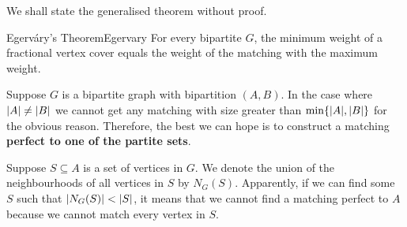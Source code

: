 \documentclass[math]{amznotes}
\theoremstyle{remark}
\newcommand{\0}{\mathbf{0}}
\newcommand{\1}{\mathbf{1}}
\begin{document}
We shall state the generalised theorem without proof.
\begin{thmbox}{Egerv\'{a}ry's Theorem}{Egervary}
    For every bipartite $G$, the minimum weight of a fractional vertex cover equals the weight of the matching with the maximum weight.
\end{thmbox}
Suppose $G$ is a bipartite graph with bipartition $(A, B)$. In the case where ${\left\lvert {A} \right\rvert} \neq {\left\lvert {B} \right\rvert}$ we cannot get any matching with size greater than $\min\{{\left\lvert {A} \right\rvert}, {\left\lvert {B} \right\rvert}\}$ for the obvious reason. Therefore, the best we can hope is to construct a matching \textbf{perfect to one of the partite sets}.

Suppose $S \subseteq A$ is a set of vertices in $G$. We denote the union of the neighbourhoods of all vertices in $S$ by $N_G(S)$. Apparently, if we can find some $S$ such that ${\left\lvert {N_G(S)} \right\rvert} < {\left\lvert {S} \right\rvert}$, it means that we cannot find a matching perfect to $A$ because we cannot match every vertex in $S$.
\end{document}
